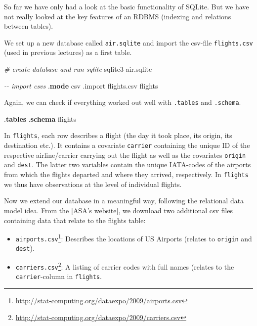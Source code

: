 \documentclass[
  12pt,
]{style/krantz}
\newenvironment{Shaded}{\begin{snugshade}}{\end{snugshade}}
\newcommand{\CommentTok}[1]{\textcolor[rgb]{0.56,0.35,0.01}{\textit{#1}}}
\newcommand{\ExtensionTok}[1]{#1}
\newcommand{\KeywordTok}[1]{\textcolor[rgb]{0.13,0.29,0.53}{\textbf{#1}}}
\newcommand{\NormalTok}[1]{#1}
\providecommand{\tightlist}{%
  \setlength{\itemsep}{0pt}\setlength{\parskip}{0pt}}
\renewcommand{\href}[2]{#2\footnote{\url{#1}}}
\begin{document}
So far we have only had a look at the basic functionality of SQLite. But we have not really looked at the key features of an RDBMS (indexing and relations between tables).

We set up a new database called \texttt{air.sqlite} and import the csv-file \texttt{flights.csv} (used in previous lectures) as a first table.

\begin{Shaded}
\begin{Highlighting}[]
\CommentTok{\# create database and run sqlite}
\ExtensionTok{sqlite3}\NormalTok{ air.sqlite}
\end{Highlighting}
\end{Shaded}

\begin{Shaded}
\begin{Highlighting}[]
\CommentTok{{-}{-} import csvs}
\NormalTok{.}\KeywordTok{mode}\NormalTok{ csv}
\NormalTok{.import flights.csv flights}
\end{Highlighting}
\end{Shaded}

Again, we can check if everything worked out well with \texttt{.tables} and \texttt{.schema}.

\begin{Shaded}
\begin{Highlighting}[]
\NormalTok{.}\KeywordTok{tables}
\NormalTok{.}\KeywordTok{schema}\NormalTok{ flights}
\end{Highlighting}
\end{Shaded}

In \texttt{flights}, each row describes a flight (the day it took place, its origin, its destination etc.). It contains a covariate \texttt{carrier} containing the unique ID of the respective airline/carrier carrying out the flight as well as the covariates \texttt{origin} and \texttt{dest}. The latter two variables contain the unique IATA-codes of the airports from which the flights departed and where they arrived, respectively. In \texttt{flights} we thus have observations at the level of individual flights.

Now we extend our database in a meaningful way, following the relational data model idea. From the {[}ASA's website{]}, we download two additional csv files containing data that relate to the flights table:

\begin{itemize}
\tightlist
\item
  \href{http://stat-computing.org/dataexpo/2009/airports.csv}{\texttt{airports.csv}}: Describes the locations of US Airports (relates to \texttt{origin} and \texttt{dest}).
\item
  \href{http://stat-computing.org/dataexpo/2009/carriers.csv}{\texttt{carriers.csv}}: A listing of carrier codes with full names (relates to the \texttt{carrier}-column in \texttt{flights}.
\end{itemize}
\end{document}
